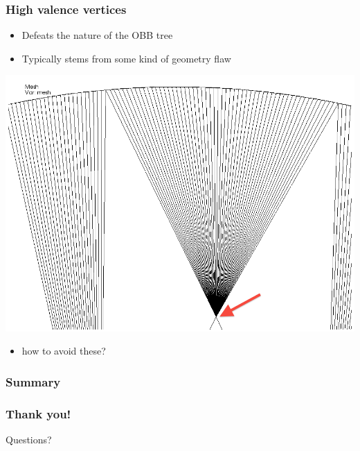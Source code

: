 \documentclass[14pt]{beamer}
\begin{document}
\begin{frame}
\frametitle{High valence vertices}
\begin{itemize}
\item Defeats the nature of the OBB tree
\item Typically stems from some kind of geometry flaw
\end{itemize}
\begin{center}
\includegraphics[scale=0.26]{high_valence_vert.png}
\end{center}
\begin{itemize}
\item how to avoid these?
\end{itemize}
\end{frame}


\begin{frame}
\frametitle{Summary}

\end{frame}


\begin{frame}
\frametitle{Thank you!}

\begin{center}
Questions?
\end{center}

\end{frame}
\end{document}
